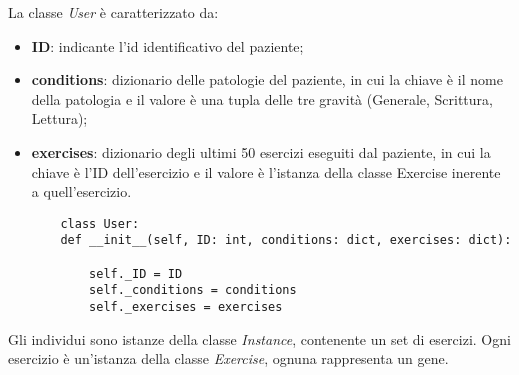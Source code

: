 \documentclass{article}
\begin{document}
\bigskip

La classe \textit{User} è caratterizzato da:
\begin{itemize}
\item\textbf{ID}: indicante l'id identificativo del paziente;
\item\textbf{conditions}: dizionario delle patologie del paziente, in cui la chiave è il nome della patologia e il valore è una tupla delle tre gravità (Generale, Scrittura, Lettura);
\item\textbf{exercises}: dizionario degli ultimi 50 esercizi eseguiti dal paziente, in cui la chiave è l'ID dell'esercizio e il valore è l'istanza della classe Exercise inerente a quell'esercizio.
\begin{lstlisting}
    class User:
    def __init__(self, ID: int, conditions: dict, exercises: dict):

        self._ID = ID
        self._conditions = conditions
        self._exercises = exercises
\end{lstlisting}
\end{itemize}
\pagebreak


Gli individui sono istanze della classe \textit{Instance}, contenente un set di esercizi. Ogni esercizio è un'istanza della classe \textit{Exercise}, ognuna rappresenta un gene.
\end{document}
